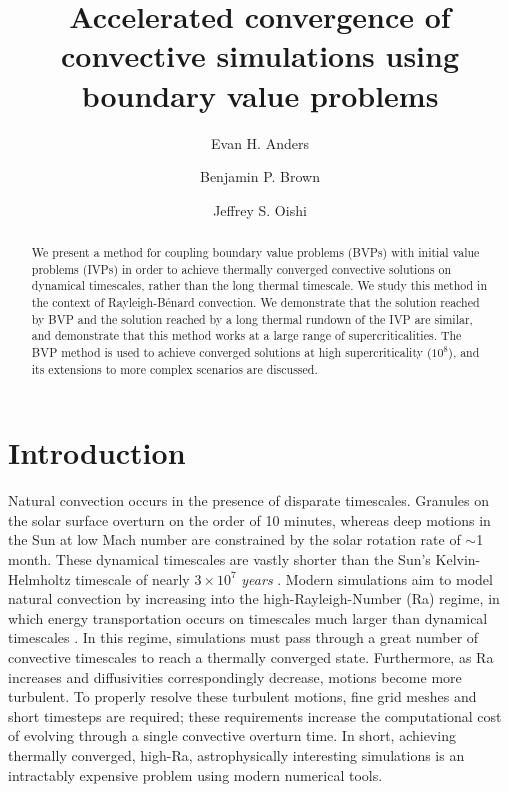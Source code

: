 \documentclass[aps, pre, onecolumn, nofootinbib, notitlepage, groupedaddress, amsfonts, amssymb, amsmath, longbibliography]{revtex4-1}
\newcommand{\RB}{Rayleigh-B\'{e}nard }
\begin{document}
\author{Evan H. Anders}
\author{Benjamin P. Brown}
\author{Jeffrey S. Oishi}
\title{Accelerated convergence of convective simulations using boundary value problems}

\begin{abstract}
We present a method for coupling boundary value problems (BVPs) with initial value problems (IVPs)
in order to achieve thermally converged convective solutions on dynamical timescales, rather than the
long thermal timescale. We study this method in the context of \RB convection. 
We demonstrate that the solution reached by BVP and the
solution reached by a long thermal rundown of the IVP are similar, and demonstrate that this method works at a
large range of supercriticalities.  The BVP method is used to achieve converged solutions at high supercriticality ($10^8$),
and its extensions to more complex scenarios are discussed.
\end{abstract}
\maketitle

\section{Introduction}
\label{sec:intro}
Natural convection occurs in the presence of disparate timescales. Granules on the
solar surface overturn on the order of 10 minutes, whereas deep motions in the Sun at
low Mach number are constrained by the solar rotation rate of $\sim$1 month.  
These dynamical timescales are vastly shorter than the Sun's 
Kelvin-Helmholtz timescale of nearly $3 \times 10^7$ \emph{years} \cite{stix2003}. 
Modern simulations aim to model natural convection
by increasing into the high-Rayleigh-Number (Ra) regime, in which energy transportation occurs on
timescales much larger than dynamical timescales \cite{anders&brown2017}.
In this regime, simulations must pass through a great number
of convective timescales to reach a thermally converged state.
Furthermore, as Ra increases and diffusivities correspondingly decrease, 
motions become more turbulent. To properly resolve these turbulent motions, fine grid meshes
and short timesteps are required; these requirements increase the computational
cost of evolving through a single convective overturn time.
In short, achieving thermally converged, high-Ra, astrophysically interesting
simulations is an intractably expensive problem using modern numerical tools.
\end{document}
